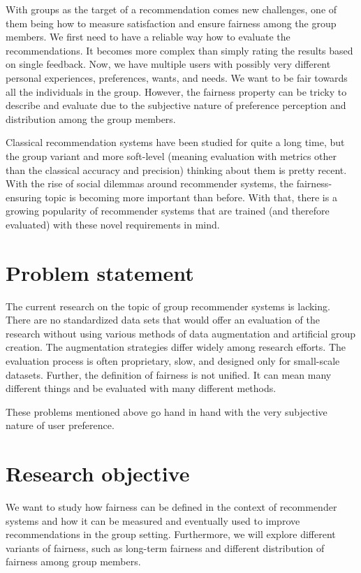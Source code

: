 With groups as the target of a recommendation comes new challenges, one of them being how to measure satisfaction and ensure fairness among the group members. We first need to have a reliable way how to evaluate the recommendations. It becomes more complex than simply rating the results based on single feedback. Now, we have multiple users with possibly very different personal experiences, preferences, wants, and needs. We want to be fair towards all the individuals in the group. However, the fairness property can be tricky to describe and evaluate due to the subjective nature of preference perception and distribution among the group members.

Classical recommendation systems have been studied for quite a long time, but the group variant and more soft-level (meaning evaluation with metrics other than the classical accuracy and precision) thinking about them is pretty recent. With the rise of social dilemmas around recommender systems, the fairness-ensuring topic is becoming more important than before. With that, there is a growing popularity of recommender systems that are trained (and therefore evaluated) with these novel requirements in mind.



\section{Problem statement}
The current research on the topic of group recommender systems is lacking. There are no standardized data sets that would offer an evaluation of the research without using various methods of data augmentation and artificial group creation. The augmentation strategies differ widely among research efforts. The evaluation process is often proprietary, slow, and designed only for small-scale datasets.
Further, the definition of fairness is not unified. It can mean many different things and be evaluated with many different methods.

These problems mentioned above go hand in hand with the very subjective nature of user preference.

\section{Research objective}

We want to study how fairness can be defined in the context of recommender systems and how it can be measured and eventually used to improve recommendations in the group setting. Furthermore, we will explore different variants of fairness, such as long-term fairness and different distribution of fairness among group members. 

